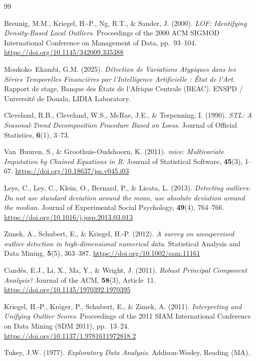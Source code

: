 \documentclass[12pt, a4paper]{article}
\begin{document}

\begin{thebibliography}{99}

Breunig, M.M., Kriegel, H.-P., Ng, R.T., \& Sander, J. (2000).
\textit{LOF: Identifying Density-Based Local Outliers}.
Proceedings of the 2000 ACM SIGMOD International Conference on
Management of Data, pp.~93--104.
\url{https://doi.org/10.1145/342009.335388}

Moukoko~Ekambi, G.M. (2025).
\textit{Détection de Variations Atypiques dans les Séries Temporelles
Financières par l'Intelligence Artificielle : État de l'Art}.
Rapport de stage, Banque des États de l'Afrique Centrale (BEAC).
ENSPD / Université de Douala, LIDIA Laboratory.

Cleveland, R.B., Cleveland, W.S., McRae, J.E., \& Terpenning, I. (1990).
\textit{STL: A Seasonal-Trend Decomposition Procedure Based on Loess}.
Journal of Official Statistics, \textbf{6}(1), 3--73.

Van~Buuren, S., \& Groothuis-Oudshoorn, K. (2011).
\textit{mice: Multivariate Imputation by Chained Equations in R}.
Journal of Statistical Software, \textbf{45}(3), 1--67.
\url{https://doi.org/10.18637/jss.v045.i03}

Leys, C., Ley, C., Klein, O., Bernard, P., \& Licata, L. (2013).
\textit{Detecting outliers: Do not use standard deviation around the mean,
use absolute deviation around the median}.
Journal of Experimental Social Psychology, \textbf{49}(4), 764--766.
\url{https://doi.org/10.1016/j.jesp.2013.03.013}

Zimek, A., Schubert, E., \& Kriegel, H.-P. (2012).
\textit{A survey on unsupervised outlier detection in high-dimensional
numerical data}.
Statistical Analysis and Data Mining, \textbf{5}(5), 363--387.
\url{https://doi.org/10.1002/sam.11161}

Cand\`{e}s, E.J., Li, X., Ma, Y., \& Wright, J. (2011).
\textit{Robust Principal Component Analysis?}
Journal of the ACM, \textbf{58}(3), Article~11.
\url{https://doi.org/10.1145/1970392.1970395}

Kriegel, H.-P., Kr\"{o}ger, P., Schubert, E., \& Zimek, A. (2011).
\textit{Interpreting and Unifying Outlier Scores}.
Proceedings of the 2011 SIAM International Conference on Data Mining
(SDM 2011), pp.~13--24.
\url{https://doi.org/10.1137/1.9781611972818.2}

Tukey, J.W. (1977).
\textit{Exploratory Data Analysis}.
Addison-Wesley, Reading (MA).

\end{thebibliography}
\end{document}
